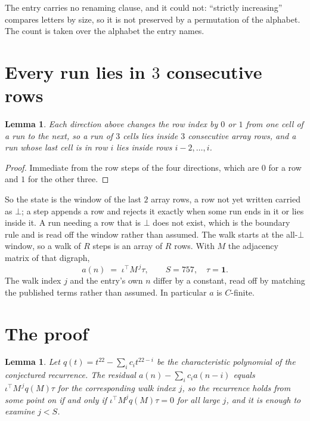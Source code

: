 \documentclass[11pt,a4paper]{article}
\theoremstyle{plain}
\newtheorem{lemma}[theorem]{Lemma}
\theoremstyle{definition}
\begin{document}
The entry carries no renaming clause, and it could not: ``strictly increasing'' compares
letters by size, so it is not preserved by a permutation of the alphabet. The count is taken
over the alphabet the entry names.

\section{Every run lies in $3$ consecutive rows}

\begin{lemma}\label{lem:win}
Each direction above changes the row index by $0$ or $1$ from one cell of a run to the next, so
a run of $3$ cells lies inside $3$ consecutive array rows, and a run whose last cell is in
row $i$ lies inside rows $i-2,\dots,i$.
\end{lemma}

\begin{proof}
Immediate from the row steps of the four directions, which are $0$ for a row and $1$ for the
other three.
\end{proof}

So the state is the window of the last $2$ array rows, a row not yet written carried as
$\bot$; a step appends a row and rejects it exactly when some run ends in it or lies inside it.
A run needing a row that is $\bot$ does not exist, which is the boundary rule and is read off
the window rather than assumed. The walk starts at the all-$\bot$ window, so a walk of $R$ steps
is an array of $R$ rows. With $M$ the adjacency matrix of that digraph,
\[
a(n)\;=\;\iota^{\!\top}M^{\,j}\tau ,\qquad S=757,\quad\tau=\mathbf{1} .
\]
The walk index $j$ and the entry's own $n$ differ by a constant, read off by matching the
published terms rather than assumed. In particular $a$ is $C$-finite.

\section{The proof}

\begin{lemma}\label{lem:crit}
Let $q(t)=t^{22}-\sum_i c_it^{22-i}$ be the characteristic polynomial of the
conjectured recurrence. The residual $a(n)-\sum_ic_ia(n-i)$ equals
$\iota^{\!\top}M^{\,j}q(M)\tau$ for the corresponding walk index $j$, so the recurrence
holds from some point on if and only if $\iota^{\!\top}M^{j}q(M)\tau=0$ for all large $j$,
and it is enough to examine $j<S$.
\end{lemma}
\end{document}
